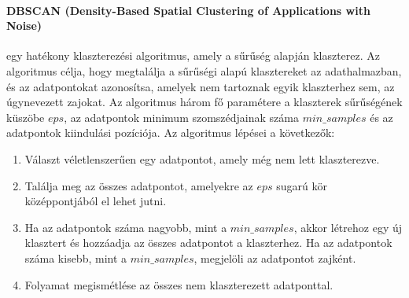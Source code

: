 \documentclass[acmtog, authorversion]{acmart}
\begin{document}
\paragraph{DBSCAN (Density-Based Spatial Clustering of Applications with Noise)} egy hatékony klaszterezési algoritmus, amely a sűrűség alapján klaszterez. Az algoritmus célja, hogy megtalálja a sűrűségi alapú klasztereket az adathalmazban, és az adatpontokat azonosítsa, amelyek nem tartoznak egyik klaszterhez sem, az úgynevezett zajokat. Az algoritmus három fő paramétere a klaszterek sűrűségének küszöbe $eps$, az adatpontok minimum szomszédjainak száma $min\_samples$ és az adatpontok kiindulási pozíciója.
Az algoritmus lépései a következők:
\begin{enumerate}
    \item Választ véletlenszerűen egy adatpontot, amely még nem lett klaszterezve.
    \item Találja meg az összes adatpontot, amelyekre az $eps$ sugarú kör középpontjából el lehet jutni.
    \item Ha az adatpontok száma nagyobb, mint a $min\_samples$, akkor létrehoz egy új klasztert és hozzáadja az összes adatpontot a klaszterhez. Ha az adatpontok száma kisebb, mint a $min\_samples$, megjelöli az adatpontot zajként.
    \item Folyamat megismétlése az összes nem klaszterezett adatponttal.
\end{enumerate}
\end{document}
